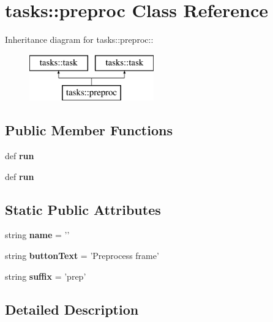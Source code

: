 \section{tasks::preproc Class Reference}
\label{classtasks_1_1preproc}
Inheritance diagram for tasks::preproc::\begin{figure}[H]
\begin{center}
\leavevmode
\includegraphics[height=2cm]{classtasks_1_1preproc}
\end{center}
\end{figure}
\subsection*{Public Member Functions}
\begin{CompactItemize}
\item 
def \textbf{run}\label{classtasks_1_1preproc_a151d5d52ce274050720956ef400766e}

\item 
def \textbf{run}\label{classtasks_1_1preproc_a151d5d52ce274050720956ef400766e}

\end{CompactItemize}
\subsection*{Static Public Attributes}
\begin{CompactItemize}
\item 
string \textbf{name} = '{\bfpreproc}'\label{classtasks_1_1preproc_83ad1d42b1a6909a3b46930c8fdb0aca}

\item 
string \textbf{button\-Text} = 'Preprocess frame'\label{classtasks_1_1preproc_57614188aa7924e43ca4a9adceb12d25}

\item 
string \textbf{suffix} = 'prep'\label{classtasks_1_1preproc_caee5bcb6e3ec530202af7d9bf9ebf63}

\end{CompactItemize}


\subsection{Detailed Description}


